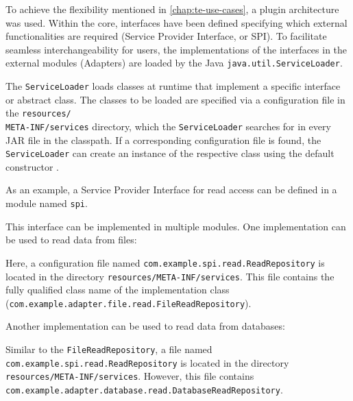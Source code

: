 To achieve the flexibility mentioned in \autoref{chap:te-use-cases}, a plugin architecture was used.
Within the core, interfaces have been defined specifying which external functionalities are required (Service Provider Interface, or SPI).
To facilitate seamless interchangeability for users, the implementations of the interfaces in the external modules (Adapters) are loaded by the Java \texttt{java.util.ServiceLoader}.

The \texttt{ServiceLoader} loads classes at runtime that implement a specific interface or abstract class.
The classes to be loaded are specified via a configuration file in the \texttt{resources/}\\\texttt{META-INF/services} directory, which the \texttt{ServiceLoader} searches for in every JAR file in the classpath.
If a corresponding configuration file is found, the \texttt{ServiceLoader} can create an instance of the respective class using the default constructor \cite{java-service-loader}.

As an example, a Service Provider Interface for read access can be defined in a module named \texttt{spi}.



\noindent
This interface can be implemented in multiple modules.
One implementation can be used to read data from files:



\noindent
Here, a configuration file named \texttt{com.example.spi.read.ReadRepository} is located in the directory \texttt{resources/META-INF/services}.
This file contains the fully qualified class name of the implementation class (\texttt{com.example.adapter.file.read.}\texttt{FileReadRepository}).

\newpage
Another implementation can be used to read data from databases:



\noindent
Similar to the \texttt{FileReadRepository}, a file named \texttt{com.example.spi.read.ReadRepository} is located in the directory \texttt{resources/META-INF/services}.
However, this file contains \texttt{com.example.adapter.database.read.DatabaseReadRepository}.

